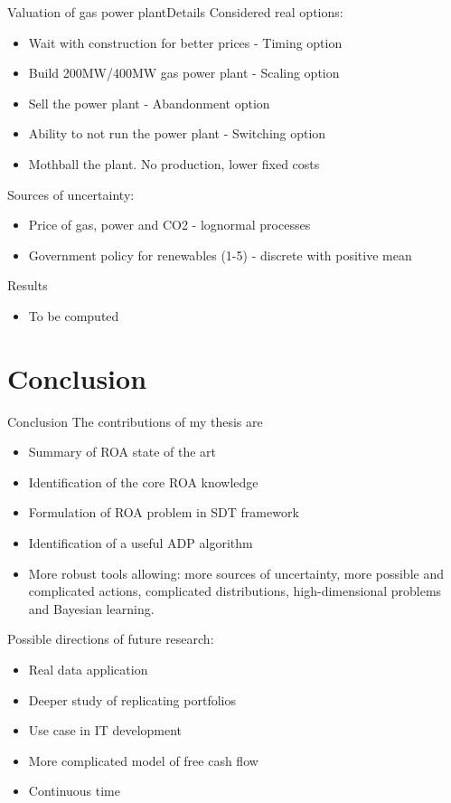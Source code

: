 \documentclass[us]{beamer}
\begin{document}
	\begin{frame}{Valuation of gas power plant}{Details}
	Considered real options:
	\begin{itemize}
		\item {Wait with construction for better prices - Timing option }
		\item {Build 200MW/400MW gas power plant - Scaling option}
		\item {Sell the power plant - Abandonment option}
		\item {Ability to not run the power plant - Switching option}
		\item {Mothball the plant. No production, lower fixed costs} 
	\end{itemize}
	
	Sources of uncertainty: 
	\begin{itemize}
		\item {Price of gas, power and CO2 - lognormal processes}
		\item {Government policy for renewables (1-5) - discrete with positive mean}
	\end{itemize}	
	\end{frame}
	

	\begin{frame}{Results}
	\begin{itemize}
		\item {To be computed}
	\end{itemize}
	\end{frame}


\section{Conclusion}

\begin{frame}{Conclusion}
	The contributions of my thesis are
  	\begin{itemize}
  	\item {Summary of ROA state of the art}
  	\item {Identification of the core ROA knowledge} 
  	\item {Formulation of ROA problem in SDT framework}
  	\item {Identification of a useful ADP algorithm}
  	\item {More robust tools allowing: more sources of uncertainty, more possible and complicated actions, complicated distributions, high-dimensional problems and Bayesian learning.}
  	\end{itemize}
  
  Possible directions of future research:
    \begin{itemize}
    \item{Real data application}
    \item{Deeper study of replicating portfolios}
    \item{Use case in IT development}
    \item{More complicated model of free cash flow}
    \item{Continuous time}
    \end{itemize}
\end{frame}
\end{document}
